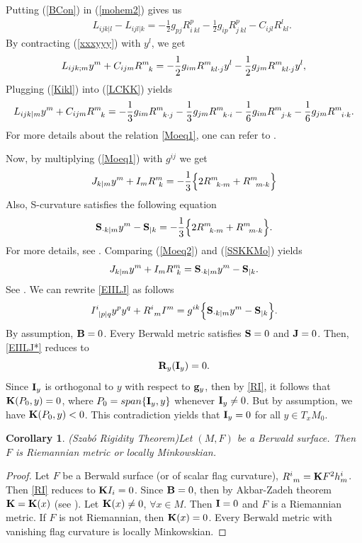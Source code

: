 \documentclass[10pt,a4paper]{amsart}
\newtheorem{cor}{Corollary}
\newcommand{\be}{\begin{equation}}
\newcommand{\ee}{\end{equation}}
\begin{document}
Putting (\ref{BCon}) in (\ref{mohem2}) gives us
\begin{eqnarray}
&&L_{ijk|l}-L_{ijl|k}=-\frac{1}{2}g_{pj}R^p_{i\ kl}-\frac{1}{2}g_{ip}R^p_{j\ kl}-C_{ijl}R^l_{\ kl}.\label{xxxyyy}
\end{eqnarray}
By contracting (\ref{xxxyyy}) with $y^l$, we get
\be
L_{ijk;m}y^m + C_{ijm}R^m_{\ \ k}
= - {1\over 2} g_{im} R^m_{\ \ kl\cdot j} y^l - {1\over 2} g_{jm} R^m_{\ \ kl\cdot j} y^l,\label{LCKK}
\ee
Plugging (\ref{Kikl}) into (\ref{LCKK}) yields
\begin{eqnarray}
L_{ijk|m}y^m + C_{ijm}R^m_{\ \ k}=   - {1\over 3}g_{im}R^m_{\ \ k\cdot j}
- {1\over 3} g_{jm} R^m_{\ \ k\cdot i}- {1\over 6} g_{im}R^m_{\ \ j\cdot k}
- {1\over 6} g_{jm}R^m_{\ \ i\cdot k}. \label{Moeq1}
\end{eqnarray}
For more details about the relation \eqref{Moeq1}, one can refer to \cite{MS}.

Now, by multiplying (\ref{Moeq1}) with $g^{ij}$  we get
\be
J_{k|m}y^m + I_mR^m_{\ k}  = -  {1\over 3} \Big \{ 2 R^m_{\ \; k\cdot m} + R^m_{\ \; m\cdot k} \Big \} \label{Moeq2}
\ee
Also, S-curvature satisfies the following equation
\be
{\bf S}_{\cdot k|m}y^m - {\bf S}_{| k}
= - {1\over 3} \Big \{ 2 R^m_{\ \; k\cdot m} + R^m_{\ \; m\cdot k} \Big \}.\label{SSKKMo}
\ee
For more details, see \cite{CMS}. Comparing (\ref{Moeq2}) and (\ref{SSKKMo}) yields
\be
J_{k|m}y^m +I_m R^m_{\ k} = {\bf S}_{\cdot k|m}y^m - {\bf S}_{|k}. \label{EIILJ}
\ee
See \cite{Shn}. We can rewrite \eqref{EIILJ} as follows
\be
I^i_{\ | p|q} y^py^q +  R^i_{\ m}I^m = g^{ik} \Big \{ {\bf S}_{\cdot k|m}y^m - {\bf S}_{|k} \Big \}. \label{EIILJ*}
\ee
By assumption, ${\bf B}=0$. Every Berwald metric satisfies ${\bf S}=0$ and ${\bf J}=0$. Then, \eqref{EIILJ*} reduces to
\be
{\bf R}_y({\bf I}_y)=0. \label{RI}
\ee
Since ${\bf I}_y$ is orthogonal to $y$ with respect to ${\bf g}_y$, then by \eqref{RI}, it follows that  ${\bf K}(P_0, y)=0$, where
$P_0= {\rm span} \{{\bf I}_y, y\}$ whenever ${\bf I}_y \not=0$. But by assumption, we have ${\bf K}(P_0, y)<0$. This contradiction yields that   ${\bf I}_y =0$ for all $y\in T_xM_0$.

\begin{cor}{\rm (Szab\'{o} Rigidity Theorem)}\label{CSZ}
Let $(M, F)$ be a Berwald surface. Then $F$ is Riemannian metric or locally Minkowskian.
\end{cor}

\begin{proof}
Let $F$ be a Berwald surface (or of scalar flag curvature), $R^i_{\ m}={\bf K}F^2h^i_m$. Then \eqref{RI} reduces to ${\bf K}I_i =0$. Since ${\bf B}=0$, then by Akbar-Zadeh theorem ${\bf K}={\bf K}(x)$ (see \cite{AZ}). Let  ${\bf K}(x)\neq 0$, $\forall x\in M$. Then ${\bf I}=0$ and $F$ is a Riemannian metric.  If $F$ is not Riemannian, then ${\bf K}(x)= 0$. Every Berwald metric with vanishing flag curvature is locally Minkowskian.
\end{proof}
\end{document}
